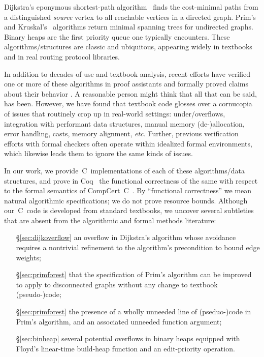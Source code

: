 Dijkstra's eponymous shortest-path algorithm~\cite{DBLP:journals/nm/Dijkstra59} finds
the cost-minimal paths from a distinguished \emph{source} vertex
to all reachable vertices in a directed graph. Prim's~\cite{prim2:prim} and Kruskal's~\cite{kruskal} algorithms return minimal spanning trees for undirected graphs.  Binary heaps are the first priority queue one typically encounters.
These algorithms/structures are classic and ubiquitous, appearing widely in textbooks~\cite{clrs,DBLP:books/daglib/0022194,heineman2008algorithms,rozen,kepnergilbert,sedgewick} and in real routing protocol libraries.

In addition to decades of use and textbook analysis, recent efforts have verified one or more of these algorithms in proof
assistants and formally proved claims about their behavior \cite{chen2003dijkstra,Moore2005,arthur,DBLP:journals/afp/LammichN19,DBLP:conf/ictac/Guttmann16}.  A reasonable person might think that all
that can be said, has been.  However, we have found that
textbook code glosses over a cornucopia
of issues that routinely crop up in real-world settings: under/overflows, integration with performant data structures, manual memory (de-)allocation,
error handling, casts, memory alignment, \emph{etc.} Further, previous verification efforts with formal checkers often operate
within idealized formal environments, which likewise leads them to ignore the same kinds of issues.

In our work, we provide~C~implementations of each of these algorithms/data structures, and prove in Coq~\cite{Coq} the functional correctness of the same with respect to the formal semantics of CompCert~C~\cite{leroy:compcert}.  By ``functional correctness'' we mean natural algorithmic specifications; we do not prove resource bounds.  Although our~C~code is developed from standard textbooks, we uncover several subtleties
that are absent from the algorithmic and formal methods literature:
\vspace*{-0.25em}
\begin{itemize}
\item[\S\ref{sec:dijkoverflow}] an overflow in Dijkstra's algorithm whose avoidance requires a nontrivial refinement to the algorithm's precondition to bound edge weights;
\item[\S\ref{sec:primforest}] that the specification of Prim's algorithm can be improved to apply to disconnected graphs without any change to textbook (pseudo-)code;
\item[\S\ref{sec:primforest}] the presence of a wholly unneeded line of (pseduo-)code in Prim's algorithm, and an associated unneeded function argument;
\item[\S\ref{sec:binheap}] several potential overflows in binary heaps equipped with Floyd's linear-time build-heap function and an edit-priority operation.
\end{itemize}
\vspace*{-0.25em}

